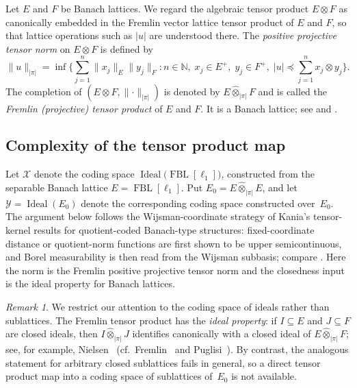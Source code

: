 \documentclass[12pt]{amsart}
\theoremstyle{plain}
\theoremstyle{definition}
\theoremstyle{remark}
\newtheorem{remark}[theorem]{Remark}
\DeclareMathOperator{\FBL}{FBL}
\DeclareMathOperator{\Ideal}{Ideal}
\newcommand{\N}{\mathbb{N}}
\begin{document}
Let $E$ and $F$ be Banach lattices.  We regard the algebraic tensor product
$E \otimes F$ as canonically embedded in the Fremlin vector lattice tensor
product of $E$ and $F$, so that lattice operations such as $\lvert u \rvert$
are understood there.  The \emph{positive projective tensor norm} on
$E \otimes F$ is defined by
\[
    \lVert u \rVert_{|\pi|}
    = \inf\biggl\{\sum_{j=1}^n \lVert x_j \rVert_E \lVert y_j \rVert_F
    \colon n \in \N,\; x_j \in E^+,\; y_j \in F^+,\;
    \lvert u \rvert \preceq \sum_{j=1}^n x_j \otimes y_j\biggr\}.
\]
The completion of $(E \otimes F,\lVert\cdot\rVert_{|\pi|})$ is denoted by
$E \hat{\otimes}_{|\pi|} F$ and is called the \emph{Fremlin (projective)
tensor product} of $E$ and $F$.  It is a Banach lattice; see
\cite{Frem1974Ban} and \cite{Pug2007Fremlin}.

\subsection{Complexity of the tensor product map}

Let $\mathscr{X}$ denote the coding space $\Ideal\bigl(\FBL[\ell_1]\bigr)$,
constructed from the separable Banach lattice $E = \FBL[\ell_1]$.
Put $E_0 = E \hat{\otimes}_{|\pi|} E$, and let
$\mathscr{Y} = \Ideal(E_0)$ denote the corresponding coding space constructed
over~$E_0$.  The argument below follows the Wijsman-coordinate strategy of
Kania's tensor-kernel results for quotient-coded Banach-type structures:
fixed-coordinate distance or quotient-norm functions are first shown to be upper
semicontinuous, and Borel measurability is then read from the Wijsman subbasis;
compare \cite[Proposition~9.2 and Propositions~9.5--9.6]{Kan2026Pol}.  Here the
norm is the Fremlin positive projective tensor norm and the closedness input is
the ideal property for Banach lattices.

\begin{remark}\label{rem:ideals-not-subl}
We restrict our attention to the coding space of ideals rather than sublattices.
The Fremlin tensor product has the \emph{ideal property}: if $I \subseteq E$ and
$J \subseteq F$ are closed ideals, then $I \hat{\otimes}_{|\pi|} J$ identifies
canonically with a closed ideal of $E \hat{\otimes}_{|\pi|} F$; see, for example,
Nielsen~\cite{Nie1982Ideal} (cf.\ Fremlin~\cite{Frem1974Ban} and
Puglisi~\cite{Pug2007Fremlin}).
By contrast, the analogous statement for arbitrary closed sublattices fails in
general, so a direct tensor product map into a coding space of sublattices
of~$E_0$ is not available.
\end{remark}
\end{document}

